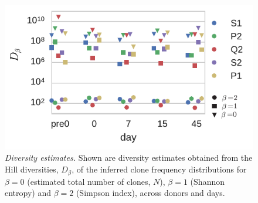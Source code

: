 \begin{figure}
\includegraphics[width=\linewidth]{fig4_div_estimates}
\centering{}
\caption{\emph{Diversity estimates.} Shown are diversity estimates obtained from the Hill diversities, $D_\beta$, of the inferred clone frequency distributions for $\beta=0$ (estimated total number of clones, $N$), $\beta=1$ (Shannon entropy) and $\beta=2$ (Simpson index), across donors and days.
\label{fig:div_estimates}}
\end{figure}

